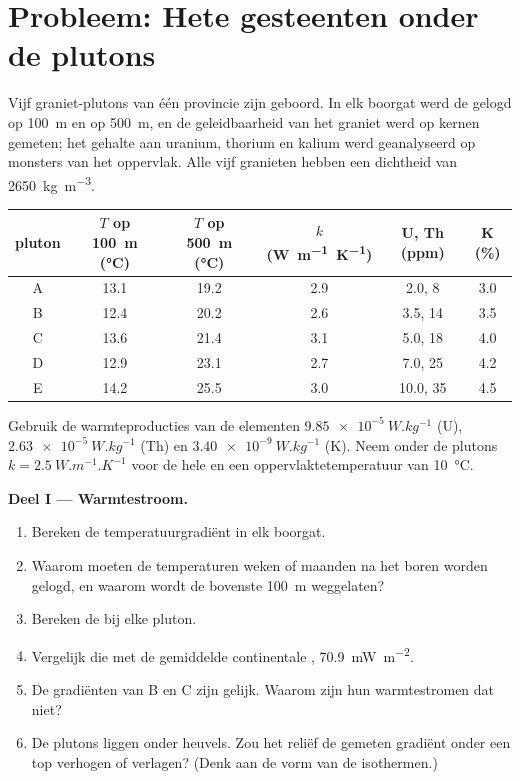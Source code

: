 \section{Probleem: Hete gesteenten onder de plutons}

\begin{problem}
\label{pb:b1:heat-budget:1}
Vijf graniet-plutons van één provincie zijn geboord. In elk boorgat werd de  gelogd op \qty{100}{m} en op \qty{500}{m}, en de geleidbaarheid van het graniet werd op kernen gemeten; het gehalte aan uranium, thorium en kalium werd geanalyseerd op monsters van het oppervlak. Alle vijf granieten hebben een dichtheid van \qty{2650}{kg.m^{-3}}.
\begin{center}
\small
\begin{tabular}{cccccc}
\hline
pluton & $T$ op \qty{100}{m} (\unit{\degreeCelsius}) & $T$ op \qty{500}{m} (\unit{\degreeCelsius}) & $k$ (\unit{W.m^{-1}.K^{-1}}) & U, Th (ppm) & K (\unit{\percent}) \\
\hline
A & 13.1 & 19.2 & 2.9 & 2.0, 8 & 3.0 \\
B & 12.4 & 20.2 & 2.6 & 3.5, 14 & 3.5 \\
C & 13.6 & 21.4 & 3.1 & 5.0, 18 & 4.0 \\
D & 12.9 & 23.1 & 2.7 & 7.0, 25 & 4.2 \\
E & 14.2 & 25.5 & 3.0 & 10.0, 35 & 4.5 \\
\hline
\end{tabular}
\end{center}
Gebruik de warmteproducties van de elementen $\qty{9.85e-5}{W.kg^{-1}}$ (U), $\qty{2.63e-5}{W.kg^{-1}}$ (Th) en $\qty{3.40e-9}{W.kg^{-1}}$ (K). Neem onder de plutons $k = \qty{2.5}{W.m^{-1}.K^{-1}}$ voor de hele  en een oppervlaktetemperatuur van \qty{10}{\degreeCelsius}.

\medskip
\noindent\textbf{Deel I --- Warmtestroom.}
\begin{enumerate}
  \item Bereken de temperatuurgradiënt in elk boorgat.
  \item Waarom moeten de temperaturen weken of maanden na het boren worden gelogd, en waarom wordt de bovenste \qty{100}{m} weggelaten?
  \item Bereken de  bij elke pluton.
  \item Vergelijk die met de gemiddelde continentale , \qty{70.9}{mW.m^{-2}}.
  \item De gradiënten van B en C zijn gelijk. Waarom zijn hun warmtestromen dat niet?
  \item De plutons liggen onder heuvels. Zou het reliëf de gemeten gradiënt onder een top verhogen of verlagen? (Denk aan de vorm van de isothermen.)
\end{enumerate}


\end{problem}
